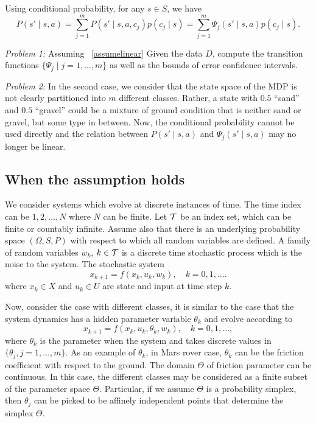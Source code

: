\documentclass{article}[11pt]
\begin{document}
\begin{assumption}
\label{assumelinear}
Using conditional probability, for any $s\in S$, we have
\[
  P(s' \mid s,a) = \sum_{j=1}^m  P(s' \mid s,a , c_j) p(c_j \mid s)  = \sum_{j=1}^m \Psi_j(s'\mid s,a ) p(c_j\mid s).
\]
\end{assumption}
 
\emph{Problem 1:} Assuming ~\ref{assumelinear} Given the data $D$,
compute the transition functions $\{\Psi_j \mid j=1,\ldots, m\}$ as
well as the bounds of error confidence intervals.

\emph{Problem 2:} In the second case, we consider that the state space
of the MDP is not clearly partitioned into $m$ different
classes. Rather, a state with $0.5$ ``sand'' and $0.5$ ``gravel''
could be a mixture of ground condition that is neither sand or gravel,
but some type in between.  Now, the conditional probability cannot be
used directly and the relation between $P(s'\mid s,a)$ and
$\Psi_j(s'\mid s,a )$ may no longer be linear. 

\subsection{When the assumption holds}
We consider systems which evolve at discrete instances of time. The
time index can be $1,2,\ldots, N$ where $N$ can be finite.  Let
$\cal T$ be an index set, which can be finite or countably
infinite. Assume also that there is an underlying probability space
$(\Omega, S, P)$ with respect to which all random variables are
defined. A family of random variables $w_k$, $k\in \cal T$ is a
discrete time stochastic process which is the noise to the system. The
stochastic system
\[
x_{k+1}   =f(x_k, u_k, w_k), \quad k=0,1,\ldots.
\]
where $x_k \in X$ and $u_k\in U$ are state and input at time step $k$.




Now, consider the case with different classes, it is similar to the
case that the system dynamics has a hidden parameter variable
$\theta_k$ and evolve according to
\[
x_{k+1} =f (x_k, u_k, \theta_k , w_k), \quad k=0,1,\ldots,
\]
where $\theta_k$ is the parameter when the system and takes discrete
values in $\{\theta_j, j=1,\ldots, m\}$. As an example of $\theta_k$,
in Mars rover case, $\theta_k$ can be the friction coefficient with
respect to the ground. The domain $\Theta$ of friction parameter can
be continuous. In this case, the different classes may be considered
as a finite subset of the parameter space $\Theta$. Particular, if we
assume $\Theta$ is a probability simplex, then $\theta_j$ can be
picked to be affinely independent points that determine the simplex
$\Theta$.
\end{document}
